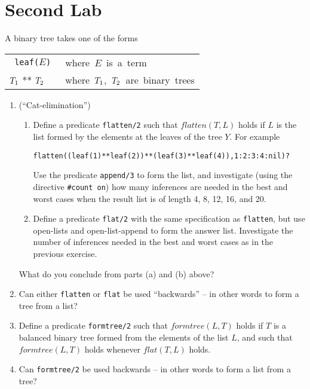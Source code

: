 \documentclass{article}
\newenvironment{smalltt}{\begin{small}\begin{alltt}}{\end{alltt}\end{small}}
\def\rmbox#1{\mbox{{\rm #1}}}
\begin{document}
\section{Second Lab}
A binary tree takes one of the forms

\begin{center}\begin{tabular}{ll}\tt
        leaf(\(E\))             &\rmbox{where \(E\) is a term}
        \\
        \(T\sb1\) ** \(T\sb2\)   &\rmbox{where \(T\sb1\), \(T\sb2\) are binary trees}
\end{tabular}
\end{center}
\begin{enumerate}
\item (``Cat-elimination'')
\begin{enumerate}
\item Define a predicate {\tt flatten/2} such that $flatten(T, L)$ holds 
if $L$ is the list formed by the elements at the leaves of the tree $Y$.
For example
\begin{smalltt}
        flatten((leaf(1)**leaf(2))**(leaf(3)**leaf(4)), 1:2:3:4:nil)?
\end{smalltt}
Use the predicate {\tt append/3} to form the list, and investigate 
(using the directive {\tt \#count on}) how
many inferences are needed in the best and worst cases when the result list 
is of length 4, 8, 12, 16, and 20. 

\item Define a predicate {\tt flat/2} with the same specification
as {\tt flatten}, but use open-lists and open-list-append to 
form the answer list. Investigate the number of inferences needed in the
best and worst cases as in the previous exercise.

\end{enumerate}
What do you conclude from parts (a) and (b) above?

\item Can either {\tt flatten} or {\tt flat} be used ``backwards'' -- 
in other words to form a tree from a list? 

\item Define a predicate {\tt formtree/2} such that $formtree(L, T)$ holds
if $T$ is a balanced binary tree formed from the elements of the list $L$, 
and such that $formtree(L, T)$ holds whenever $flat(T, L)$ holds.

\item Can {\tt formtree/2} be used backwards -- in other words to form a list from a tree?

\end{enumerate}
\end{document}

